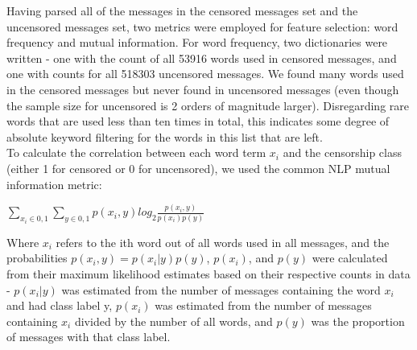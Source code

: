 \documentclass{article} %
\begin{document}
\begin{CJK*}{UTF8}{gbsn}
Having parsed all of the messages in the censored messages set and the uncensored messages set, two metrics were employed for feature selection: word frequency and mutual information. For word frequency, two dictionaries were written - one with the count of all 53916 words used in censored messages, and one with counts for all 518303 uncensored messages. We found many words used in the censored messages but never found in uncensored messages (even though the sample size for uncensored is 2 orders of magnitude larger). Disregarding rare words that are used less than ten times in total, this indicates some degree of absolute keyword filtering for the words in this list that are left. \\ 

To calculate the correlation between each word term $x_{i}$ and the censorship class (either 1 for censored or 0 for uncensored), we used the common NLP mutual information metric:

\begin{center}
$\sum_{x_{i}\in{0,1}}\sum_{y\in{0,1}}p(x_{i},y)log_{2}\frac{p(x_{i},y)}{p(x_{i})p(y)}$
\end{center}

Where $x_{i}$ refers to the ith word out of all words used in all messages, and the probabilities $p(x_{i},y) = p(x_{i}|y)p(y)$, $p(x_{i})$, and $p(y)$ were calculated from their maximum likelihood estimates based on their respective counts in data - $p(x_{i}|y)$ was estimated from the number of messages containing the word $x_{i}$ and had class label y, $p(x_{i})$ was estimated from the number of messages containing $x_{i}$ divided by the number of all words, and $p(y)$ was the proportion of messages with that class label.  


\end{CJK*}
\end{document}
